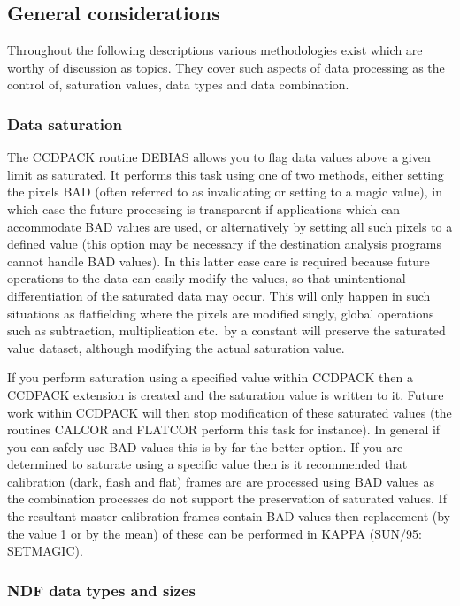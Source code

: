 \subsection{General considerations}

Throughout the following descriptions various methodologies exist which are
worthy of discussion as topics. They cover such aspects of data processing as
the control of, saturation values, data types and data combination.

\subsubsection{Data saturation}

The CCDPACK routine DEBIAS allows you to flag data values above a given
limit as saturated. It performs this task using one of two methods,
either setting the pixels BAD (often referred to as invalidating or
setting to a magic value), in which case the future processing is
transparent if applications which can accommodate BAD values are used,
or alternatively by setting all such pixels to a defined value (this
option may be necessary if the destination analysis programs cannot
handle BAD values). In this latter case care is required because future
operations to the data can easily modify the values, so that
unintentional differentiation of the saturated data may occur. This will
only happen in such situations as flatfielding where the pixels are
modified singly, global operations such as subtraction, multiplication
etc.\ by a constant will preserve the saturated value dataset, although
modifying the actual saturation value. 

If you perform saturation using a specified value within CCDPACK then a
CCDPACK extension is created and the saturation value is written to it.
Future work within CCDPACK will then stop modification of these
saturated values (the routines CALCOR and FLATCOR perform this task for
instance). In general if you can safely use BAD values this is by far
the better option. If you are determined to saturate using a specific
value then is it recommended that calibration (dark, flash and flat)
frames are are processed using BAD values as the combination processes
do not support the preservation of saturated values. If the resultant
master calibration frames contain BAD values then replacement (by the
value 1 or by the mean) of these can be performed in KAPPA (SUN/95:
SETMAGIC).

\subsubsection{NDF data types and sizes}

